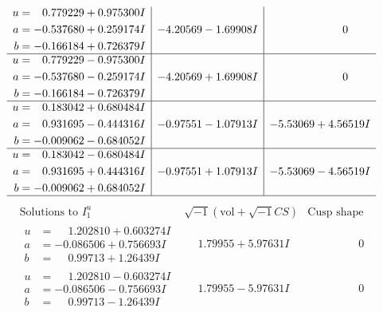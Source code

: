 \documentclass[1p]{elsarticle_modified}
\theoremstyle{definition}
\newcommand{\I}{\sqrt{-1}}
\begin{document}
$$\begin{array}{c|c|c}
\begin{aligned}
u &= \phantom{-}0.779229 + 0.975300 I \\
a &= -0.537680 + 0.259174 I \\
b &= -0.166184 + 0.726379 I\end{aligned}
 & -4.20569 - 1.69908 I & \phantom{-0.000000 } 0 \\ \hline\begin{aligned}
u &= \phantom{-}0.779229 - 0.975300 I \\
a &= -0.537680 - 0.259174 I \\
b &= -0.166184 - 0.726379 I\end{aligned}
 & -4.20569 + 1.69908 I & \phantom{-0.000000 } 0 \\ \hline\begin{aligned}
u &= \phantom{-}0.183042 + 0.680484 I \\
a &= \phantom{-}0.931695 - 0.444316 I \\
b &= -0.009062 - 0.684052 I\end{aligned}
 & -0.97551 - 1.07913 I & -5.53069 + 4.56519 I \\ \hline\begin{aligned}
u &= \phantom{-}0.183042 - 0.680484 I \\
a &= \phantom{-}0.931695 + 0.444316 I \\
b &= -0.009062 + 0.684052 I\end{aligned}
 & -0.97551 + 1.07913 I & -5.53069 - 4.56519 I\\
 \hline 
 \end{array}$$\newpage$$\begin{array}{c|c|c}  
\text{Solutions to }I^u_{1}& \I (\text{vol} + \sqrt{-1}CS) & \text{Cusp shape}\\
 \hline 
\begin{aligned}
u &= \phantom{-}1.202810 + 0.603274 I \\
a &= -0.086506 + 0.756693 I \\
b &= \phantom{-}0.99713 + 1.26439 I\end{aligned}
 & \phantom{-}1.79955 + 5.97631 I & \phantom{-0.000000 } 0 \\ \hline\begin{aligned}
u &= \phantom{-}1.202810 - 0.603274 I \\
a &= -0.086506 - 0.756693 I \\
b &= \phantom{-}0.99713 - 1.26439 I\end{aligned}
 & \phantom{-}1.79955 - 5.97631 I & \phantom{-0.000000 } 0 \\ \hline\begin{aligned}

\end{aligned}
\end{array}$$
\end{document}
